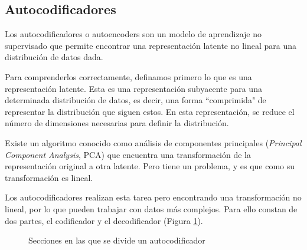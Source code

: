 \subsection{Autocodificadores}
Los autocodificadores o autoencoders son un modelo de aprendizaje no supervisado que permite encontrar una representación latente no lineal para una distribución de datos dada.

Para comprenderlos correctamente, definamos primero lo que es una representación latente. Esta es una representación subyacente para una determinada distribución de datos, es decir, una forma ``comprimida" de representar la distribución que siguen estos. En esta representación, se reduce el número de dimensiones necesarias para definir la distribución.

Existe un algoritmo conocido como análisis de componentes principales (\textit{Principal Component Analysis}, PCA) que encuentra una transformación de la representación original a otra latente. Pero tiene un problema, y es que como su transformación es lineal. \cite{vqvae}

Los autocodificadores realizan esta tarea pero encontrando una transformación no lineal, por lo que pueden trabajar con datos más complejos. Para ello constan de dos partes, el codificador y el decodificador (Figura \ref{fig:autocodificador}).

\begin{figure}[H]
\centering
    \caption{Secciones en las que se divide un autocodificador \cite{vqvae}}
    \label{fig:autocodificador}
\end{figure}

